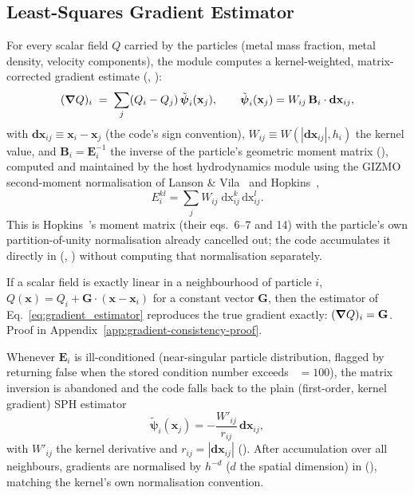 \subsection{Least-Squares Gradient Estimator}
\label{sec:gradient-estimator}
For every scalar field $Q$ carried by the particles (metal mass
fraction, metal density, velocity components), the module computes a
kernel-weighted, matrix-corrected gradient estimate
(, ):
\begin{equation}
  \label{eq:gradient_estimator}
  (\grad Q)_i \;=\; \sum_{j} (Q_i - Q_j)\, \tilde{\boldsymbol\psi}_i(\mathbf x_j) ,
  \qquad
  \tilde{\boldsymbol\psi}_i(\mathbf x_j) = W_{ij}\, \mathbf B_i \cdot \mathbf{dx}_{ij} ,
\end{equation}
with $\mathbf{dx}_{ij} \equiv \mathbf x_i - \mathbf x_j$ (the code's
sign convention), $W_{ij} \equiv W(|\mathbf{dx}_{ij}|, h_i)$ the kernel
value, and $\mathbf B_i = \mathbf E_i^{-1}$ the inverse of the particle's
geometric moment matrix (), computed and
maintained by the host hydrodynamics module using the GIZMO second-moment
normalisation of Lanson \& Vila~\citeyear{LansonVila2008} and
Hopkins~\citeyear{Hopkins2015},
\begin{equation}
  \label{eq:E_matrix_def}
  E_i^{kl} = \sum_j W_{ij}\; \mathrm{dx}_{ij}^{k}\, \mathrm{dx}_{ij}^{l} .
\end{equation}
This is Hopkins~\citeyear{Hopkins2015}'s moment matrix (their eqs.~6--7
and 14) with the particle's own partition-of-unity normalisation
already cancelled out; the code accumulates it directly in
 (,
) without computing that normalisation
separately.

\begin{proposition}
\label{prop:gradient-consistency}
If a scalar field is exactly linear in a neighbourhood of particle $i$,
$Q(\mathbf x) = Q_i + \mathbf G\cdot(\mathbf x - \mathbf x_i)$ for a
constant vector $\mathbf G$, then the estimator of
Eq.~\eqref{eq:gradient_estimator} reproduces the true gradient exactly:
$(\grad Q)_i = \mathbf G$. Proof in
Appendix~\ref{app:gradient-consistency-proof}.
\end{proposition}

Whenever $\mathbf E_i$ is ill-conditioned (near-singular particle
distribution, flagged by 
returning false when the stored condition number exceeds
~$=100$), the matrix inversion is
abandoned and the code falls back to the plain (first-order, kernel
gradient) SPH estimator
\begin{equation}
  \tilde{\boldsymbol\psi}_i(\mathbf x_j) = -\frac{W'_{ij}}{r_{ij}}\, \mathbf{dx}_{ij} ,
\end{equation}
with $W'_{ij}$ the kernel derivative and $r_{ij} = |\mathbf{dx}_{ij}|$
(). After accumulation over all
neighbours, gradients are normalised by $h^{-d}$ ($d$ the spatial
dimension) in 
(), matching the kernel's own
normalisation convention.

